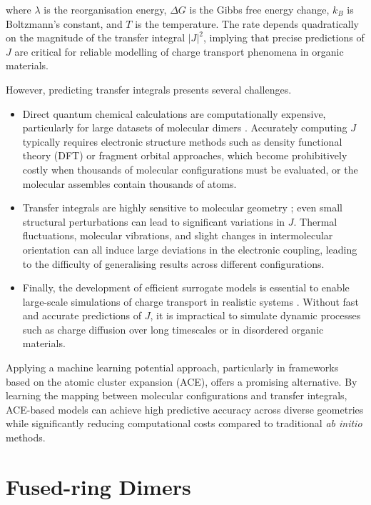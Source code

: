 where $\lambda$ is the reorganisation energy, $\Delta G$ is the Gibbs free energy change, $k_B$ is Boltzmann’s constant, and $T$ is the temperature.
The rate depends quadratically on the magnitude of the transfer integral $|J|^2$, implying that precise predictions of $J$ are critical for reliable modelling of charge transport phenomena in organic materials.

However, predicting transfer integrals presents several challenges.
\begin{itemize}
    \item Direct quantum chemical calculations are computationally expensive, particularly for large datasets of molecular dimers \cite{Troisi2011}.
    Accurately computing $J$ typically requires electronic structure methods such as density functional theory (DFT) or fragment orbital approaches, which become prohibitively costly when thousands of molecular configurations must be evaluated, or the molecular assembles contain thousands of atoms.
    \item Transfer integrals are highly sensitive to molecular geometry \cite{Troisi2006}; even small structural perturbations can lead to significant variations in $J$.
    Thermal fluctuations, molecular vibrations, and slight changes in intermolecular orientation can all induce large deviations in the electronic coupling, leading to the difficulty of generalising results across different configurations.
    \item Finally, the development of efficient surrogate models is essential to enable large-scale simulations of charge transport in realistic systems \cite{Fratini2016}.
    Without fast and accurate predictions of $J$, it is impractical to simulate dynamic processes such as charge diffusion over long timescales or in disordered organic materials.
\end{itemize}

Applying a machine learning potential approach, particularly in frameworks based on the atomic cluster expansion (ACE), offers a promising alternative.
By learning the mapping between molecular configurations and transfer integrals, ACE-based models can achieve high predictive accuracy across diverse geometries while significantly reducing computational costs compared to traditional \textit{ab initio} methods.


\section{Fused-ring Dimers} \label{sec:4.2}

